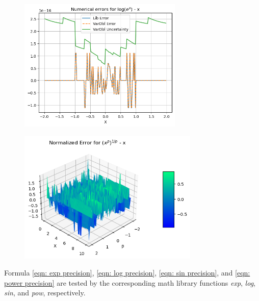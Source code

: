 \documentclass[twoside]{article}
\numberwithin{equation}{section}
\begin{document}
\begin{figure}[p]
\centering
\includegraphics[height=2.5in]{ExpLog_Error.png} 
\label{fig: ExpLog_Error}
\end{figure}

\begin{figure}[p]
\centering
\includegraphics[height=2.5in]{Power_Error.png} 
\label{fig: Power_Error}
\end{figure}


Formula \eqref{eqn: exp precision}, \eqref{eqn: log precision}, \eqref{eqn: sin precision}, and \eqref{eqn: power precision} are tested by the corresponding math library functions \textit{exp}, \textit{log}, \textit{sin}, and \textit{pow}, respectively.
\end{document}
